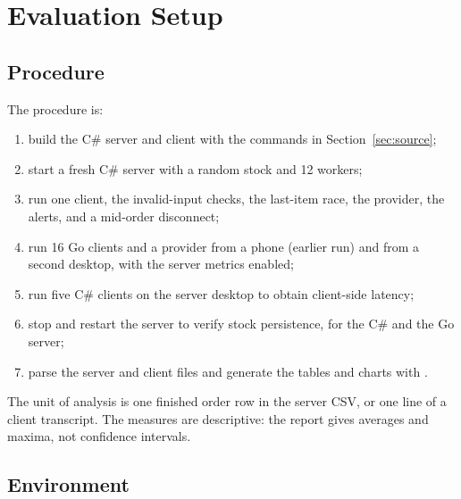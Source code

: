 \documentclass[12pt,a4paper]{article}
\begin{document}
\section{Evaluation Setup}
\label{sec:setup}

\subsection{Procedure}

The procedure is:
\begin{enumerate}[itemsep=1pt]
    \item build the C\# server and client with the commands in Section~\ref{sec:source};
    \item start a fresh C\# server with a random stock and 12 workers;
    \item run one client, the invalid-input checks, the last-item race, the
          provider, the alerts, and a mid-order disconnect;
    \item run 16 Go clients and a provider from a phone (earlier run) and from a
          second desktop, with the server metrics enabled;
    \item run five C\# clients on the server desktop to obtain client-side latency;
    \item stop and restart the server to verify stock persistence, for the C\# and the Go server;
    \item parse the server and client files and generate the tables and charts with
          .
\end{enumerate}

The unit of analysis is one finished order row in the server CSV, or one line of a
client transcript. The measures are descriptive: the report gives averages and
maxima, not confidence intervals.

\subsection{Environment}
\end{document}
